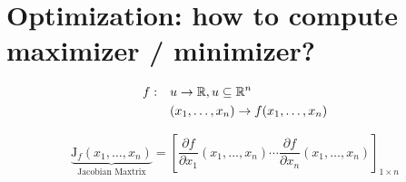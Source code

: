 
\section{Optimization: how to compute maximizer / minimizer?}
\begin{equation*}
    \begin{split}
        f: & \quad u\to\mathbb{R}, u\subseteq\mathbb{R}^n\\
        & \quad (x_1,\ldots,x_n)\to f(x_1,\ldots,x_n)
    \end{split}
\end{equation*}

\begin{equation*}
    \underbrace{\text{J}_f(x_1,\ldots,x_n)}_{\text{Jacobian Maxtrix}} = \left[\frac{\partial f}{\partial x_1}(x_1,\ldots,x_n) \cdots \frac{\partial f}{\partial x_n}(x_1,\ldots,x_n)\right]_{1\times n}
\end{equation*}

